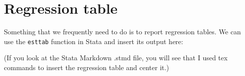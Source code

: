 \documentclass[]{article}
\begin{document}
\hypertarget{regression-table}{%
\section{Regression table}\label{regression-table}}

Something that we frequently need to do is to report regression tables.
We can use the \texttt{esttab} function in Stata and insert its output
here:

\begin{stlog}

{\smallskip}

{\smallskip}

\end{stlog}

\begin{center}

\end{center}

(If you look at the Stata Markdown .stmd file, you will see that I used
tex commands to insert the regression table and center it.)
\end{document}
